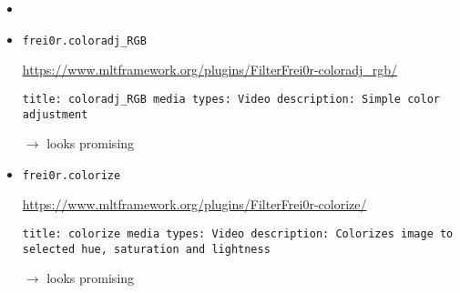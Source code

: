 \documentclass[12pt,a4paper]{article}
\begin{document}
\begin{itemize}
\begin{itemize}
		
		\item[]
		\item \texttt{frei0r.coloradj\_RGB}
		
		\url{https://www.mltframework.org/plugins/FilterFrei0r-coloradj_rgb/}
		
		\texttt{title: coloradj\_RGB \newline
			media types: Video \newline
			description: Simple color adjustment}
		
		$\rightarrow$ looks promising
		
		
		\item \texttt{frei0r.colorize}
		
		\url{https://www.mltframework.org/plugins/FilterFrei0r-colorize/}
		
		\texttt{title: colorize \newline
			media types: Video \newline
			description: Colorizes image to selected hue, saturation and lightness}
		
		$\rightarrow$ looks promising
		
		
	\end{itemize}


\end{itemize}



\newpage

\begin{spacing}{1}
	\printbibliography
\end{spacing}
	
	
	
\end{document}
